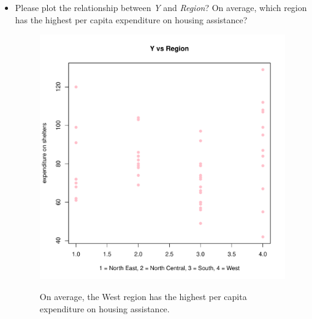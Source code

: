 \documentclass[12pt,letterpaper]{article}
\begin{document}
\begin{itemize}
\item
Please plot the relationship between \emph{Y} and \emph{Region}? On average, which region has the highest per capita expenditure on housing assistance?


\begin{figure}[h!]\centering
	\begin{minipage}{0.45\textwidth}  
		\centering
		\includegraphics[width=\textwidth]{plot_example7.pdf}
	\end{minipage}\hfill
	\begin{minipage}{0.45\textwidth} 
		\flushleft
		On average, the West region has the highest per capita expenditure on housing assistance.
	\end{minipage}
\end{figure}

\end{itemize}

\vspace{.5cm}
\end{document}
